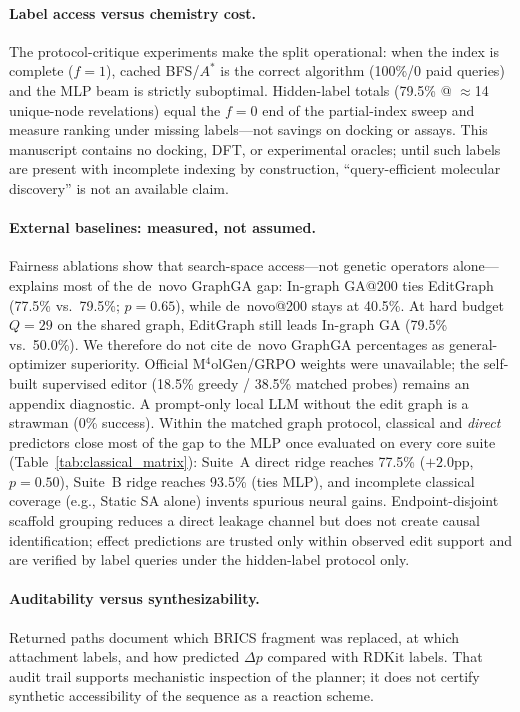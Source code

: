 \documentclass[journal=jcisd8,manuscript=article,email=false]{achemso}
\begin{document}
\paragraph{Label access versus chemistry cost.}
The protocol-critique experiments make the split operational: when the index is complete ($f{=}1$), cached BFS/$A^\ast$ is the correct algorithm (100\%/0 paid queries) and the MLP beam is strictly suboptimal. Hidden-label totals (79.5\% @ $\approx$14 unique-node revelations) equal the $f{=}0$ end of the partial-index sweep and measure ranking under missing labels---not savings on docking or assays. This manuscript contains no docking, DFT, or experimental oracles; until such labels are present with incomplete indexing by construction, ``query-efficient molecular discovery'' is not an available claim.

\paragraph{External baselines: measured, not assumed.}
Fairness ablations show that search-space access---not genetic operators alone---explains most of the de~novo GraphGA gap: In-graph GA@200 ties EditGraph (77.5\% vs.\ 79.5\%; $p{=}0.65$), while de~novo@200 stays at 40.5\%. At hard budget $Q{=}29$ on the shared graph, EditGraph still leads In-graph GA (79.5\% vs.\ 50.0\%). We therefore do not cite de~novo GraphGA percentages as general-optimizer superiority. Official M$^4$olGen/GRPO weights were unavailable; the self-built supervised editor (18.5\% greedy / 38.5\% matched probes) remains an appendix diagnostic. A prompt-only local LLM without the edit graph is a strawman (0\% success). Within the matched graph protocol, classical and \emph{direct} predictors close most of the gap to the MLP once evaluated on every core suite (Table~\ref{tab:classical_matrix}): Suite~A direct ridge reaches 77.5\% ($+2.0$pp, $p{=}0.50$), Suite~B ridge reaches 93.5\% (ties MLP), and incomplete classical coverage (e.g., Static SA alone) invents spurious neural gains. Endpoint-disjoint scaffold grouping reduces a direct leakage channel but does not create causal identification; effect predictions are trusted only within observed edit support and are verified by label queries under the hidden-label protocol only.

\paragraph{Auditability versus synthesizability.}
Returned paths document which BRICS fragment was replaced, at which attachment labels, and how predicted $\Delta p$ compared with RDKit labels. That audit trail supports mechanistic inspection of the planner; it does not certify synthetic accessibility of the sequence as a reaction scheme.
\end{document}
